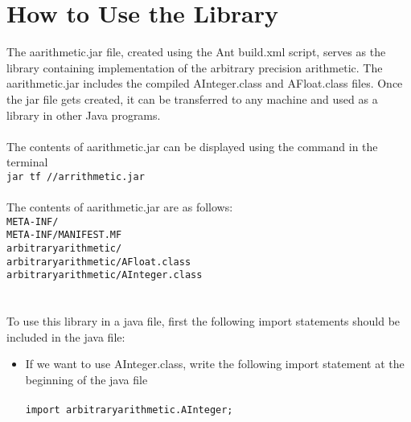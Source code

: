 \documentclass[a4paper,12pt]{article}
\begin{document}
{\section{How to Use the Library}
 The aarithmetic.jar file, created using the Ant build.xml script, serves as the library containing implementation of the arbitrary precision arithmetic. The aarithmetic.jar includes the compiled AInteger.class and AFloat.class files. Once the jar file gets created, it can be transferred to any machine and used as a library in other Java programs.\\\\
 The contents of aarithmetic.jar can be displayed using the command in the terminal\\ \texttt{jar tf //arrithmetic.jar}\\\\The contents of aarithmetic.jar are as follows:\\
\texttt{META-INF/ \\
META-INF/MANIFEST.MF\\
arbitraryarithmetic/\\
arbitraryarithmetic/AFloat.class\\
arbitraryarithmetic/AInteger.class\\}\\\\
To use this library in a java file,  first the following import statements should be included in the java file:

\begin{itemize}
    \item If we want to use AInteger.class, write the following import statement at the beginning of the java file\\\\
    \texttt{import arbitraryarithmetic.AInteger;}\\\\


\end{itemize}}
\end{document}
